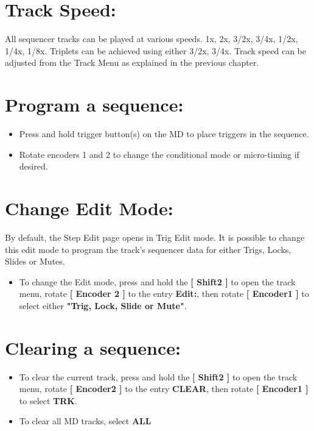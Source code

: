 \vspace{-0.3cm}

\section{Track Speed:}
All sequencer tracks can be played at various speeds. 1x, 2x, 3/2x, 3/4x, 1/2x, 1/4x, 1/8x. Triplets can be achieved using either 3/2x, 3/4x. 
Track speed can be adjusted from the Track Menu as explained in the previous chapter.

\section{Program a sequence:}
\begin{itemize}
\item Press and hold trigger button(s) on the MD to place triggers in the sequence.
\item Rotate encoders 1 and 2 to change the conditional mode or micro-timing if desired.
\end{itemize}

\section{Change Edit Mode:}
By default, the Step Edit page opens in Trig Edit mode. It is possible to change this edit mode to program the track's sequencer data for either Trigs, Locks, Slides or Mutes.
\begin{itemize}
\item To change the Edit mode, press and hold the\textbf{ [ Shift2 ]} to open the track menu, rotate \textbf{[ Encoder 2 ]} to the entry \textbf{Edit:}, then rotate \textbf{[ Encoder1 ]} to select either \textbf{"Trig, Lock, Slide or Mute"}.
\end{itemize}
\vspace{-0.3cm}

\section{Clearing a sequence:}
\begin{itemize}
\item To clear the current track, press and hold the\textbf{ [ Shift2 ]} to open the track menu, rotate \textbf{[ Encoder2 ]} to the entry \textbf{CLEAR}, then rotate \textbf{[ Encoder1 ]} to select \textbf{TRK}.
\item To clear all MD tracks, select \textbf{ALL}
\end{itemize}

